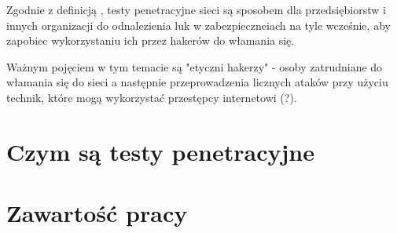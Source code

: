 Zgodnie z definicją \cite{He2006}, testy penetracyjne sieci są sposobem dla przedsiębiorstw i innych organizacji do odnalezienia luk w zabezpieczneiach na tyle wcześnie, aby zapobiec wykorzystaniu ich przez hakerów do włamania się.


Ważnym pojęciem w tym temacie są "etyczni hakerzy" - osoby zatrudniane do włamania się do sieci a następnie przeprowadzenia licznych ataków przy użyciu technik, które mogą wykorzystać przestępcy internetowi (?).




\section{Czym są testy penetracyjne}
\label{sec:penTest}






\section{Zawartość pracy}
\label{sec:zawartoscPracy}



